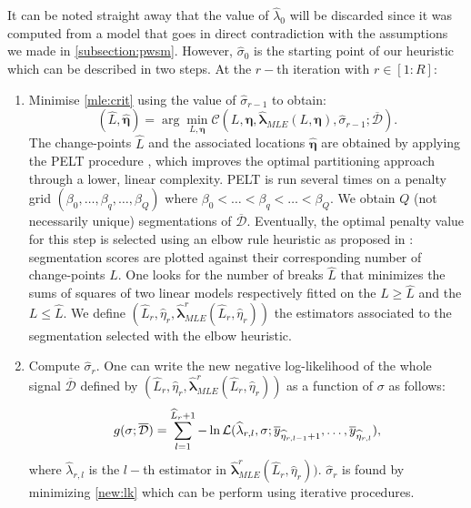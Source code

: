 It can be noted straight away that the value of $\widehat{\lambda}_0$ will be discarded since it was computed from a model that goes in direct contradiction with the assumptions we made in \ref{subsection:pwsm}. However, $\widehat{\sigma}_0$ is the starting point of our heuristic which can be described in two steps.
At the $r-$th iteration with $r \in [1:R]$:
\begin{enumerate}
    \item Minimise \ref{mle:crit} using the value of $\widehat{\sigma}_{r-1}$ to obtain:  
\begin{equation}\label{mle:crit2}
(\widehat{L}, \widehat{\bm{\eta}}) = \arg \min_{L, \bm{\eta}} \mathcal{C}(L,  \bm{\eta}, \widehat{\bm{\lambda}}_{MLE}(L, \bm{\eta}),\widehat{\sigma}_{r-1};   \overline{\mathcal{D}}).
\end{equation}
The change-points $\widehat{L}$ and the associated locations $\widehat{\bm{\eta}}$ are obtained by applying the PELT procedure \cite{Killick2012}, which improves the optimal partitioning approach through a lower, linear complexity. PELT is run several times on a penalty grid $(\beta_0,\dots,\beta_q,\dots,\beta_{Q})$ where $\beta_0<\dots<\beta_{q}<\dots<\beta_{Q}$. We obtain $Q$ (not necessarily unique) segmentations of $\overline{\mathcal{D}}$. Eventually, the optimal penalty value for this step is selected using an elbow rule heuristic as proposed in \cite{lung2015homogeneity}: segmentation scores are plotted against their corresponding number of change-points $L$. One looks for the number of breaks $\hat L$ that minimizes the sums of squares of two linear models respectively fitted on the $L \geq \hat L$ and the $L \leq \hat L$. We define $(\widehat{L}_r,\widehat{\eta}_r,\widehat{\bm{\lambda}}^r_{MLE}(\widehat{L}_r,\widehat{\eta}_r))$ the estimators associated to the segmentation selected with the elbow heuristic. 
\item Compute $\widehat{\sigma}_r$. One can write the new negative log-likelihood of the whole signal $\overline{\mathcal{D}}$ defined by $(\widehat{L}_r,\widehat{\eta}_r,\widehat{\bm{\lambda}}^r_{MLE}(\widehat{L}_r,\widehat{\eta}_r))$ as a function of $\sigma$ as follows:
\begin{equation}\label{new:lk}
g(\sigma;   \overline{\mathcal{D}})=\sum_{l=1}^{\widehat{L}_r+1}  -\ln \mathcal L(\widehat{\lambda}_{r,l},\sigma; \overline{y}_{\widehat{\eta}_{r,l-1}+1}, \ldots, \overline{y}_{\widehat{\eta}_{r,l}}),
\end{equation}
where $\widehat{\lambda}_{r,l}$ is the $l-$th estimator in $\widehat{\bm{\lambda}}^r_{MLE}(\widehat{L}_r,\widehat{\eta}_r))$. $\widehat{\sigma}_r$ is found by minimizing \ref{new:lk} which can be perform using iterative procedures. 
\end{enumerate}

